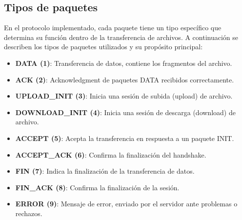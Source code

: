 \subsection{Tipos de paquetes}
En el protocolo implementado, cada paquete tiene un tipo específico que determina su función dentro de la transferencia de archivos. A continuación se describen los tipos de paquetes utilizados y su propósito principal:

\begin{itemize}
    \item \textbf{DATA (1)}: Transferencia de datos, contiene los fragmentos del archivo.
    \item \textbf{ACK (2)}: Acknowledgment de paquetes DATA recibidos correctamente.
    \item \textbf{UPLOAD\_INIT (3)}: Inicia una sesión de subida (upload) de archivo.
    \item \textbf{DOWNLOAD\_INIT (4)}: Inicia una sesión de descarga (download) de archivo.
    \item \textbf{ACCEPT (5)}: Acepta la transferencia en respuesta a un paquete INIT.
    \item \textbf{ACCEPT\_ACK (6)}: Confirma la finalización del handshake.
    \item \textbf{FIN (7)}: Indica la finalización de la transferencia de datos.
    \item \textbf{FIN\_ACK (8)}: Confirma la finalización de la sesión.
    \item \textbf{ERROR (9)}: Mensaje de error, enviado por el servidor ante problemas o rechazos.
\end{itemize}

